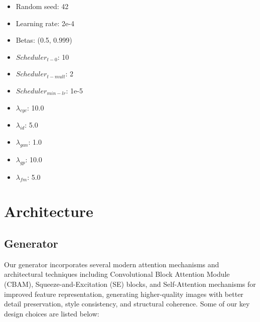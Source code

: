 \documentclass[twoside,english,notitlepage]{report}
\begin{document}
\begin{multicols}{3}
    \begin{itemize}
        \item Random seed: 42
        \item Learning rate: 2e-4
        \item Betas: (0.5, 0.999)
        \item $Scheduler_{t-0}$: 10
        \item $Scheduler_{t-mult}$: 2
        \item $Scheduler_{min-lr}$: 1e-5
        \item $\lambda_{cyc}$: 10.0
        \item $\lambda_{id}$: 5.0
        \item $\lambda_{gan}$: 1.0
        \item $\lambda_{gp}$: 10.0
        \item $\lambda_{fm}$: 5.0
    \end{itemize}
\end{multicols}

\section{Architecture}

\subsection{Generator}\label{task1:generator}
Our generator incorporates several modern attention mechanisms and architectural techniques including Convolutional Block Attention Module (CBAM), Squeeze-and-Excitation (SE) blocks, and Self-Attention mechanisms for improved feature representation, generating higher-quality images with better detail preservation, style consistency, and structural coherence. Some of our key design choices are listed below:
\end{document}
